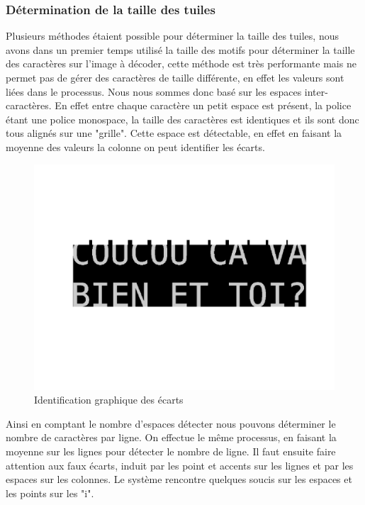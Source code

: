 \documentclass[a4paper,12pt,titlepage]{report}
\begin{document}
	\subsubsection{Détermination de la taille des tuiles}
	Plusieurs méthodes étaient possible pour déterminer la taille des tuiles, nous avons dans un premier temps utilisé la taille des motifs pour déterminer la taille des caractères sur l'image à décoder, cette méthode est très performante mais ne permet pas de gérer des caractères de taille différente, en effet les valeurs sont liées dans le processus. Nous nous sommes donc basé sur les espaces inter-caractères. En effet entre chaque caractère un petit espace est présent, la police étant une police monospace, la taille des caractères est identiques et ils sont donc tous alignés sur une "grille". Cette espace est détectable, en effet en faisant la moyenne des valeurs la colonne on peut identifier les écarts.
	\begin{figure}
		\begin{center}
			\includegraphics[scale=0.4]{../illus/detectionSpace.png}
		\end{center}
		\caption{Identification graphique des écarts}
	\end{figure}


	Ainsi en comptant le nombre d'espaces détecter nous pouvons déterminer le nombre de caractères par ligne.
	On effectue le même processus, en faisant la moyenne sur les lignes pour détecter le nombre de ligne.
	Il faut ensuite faire attention aux faux écarts, induit par les point et accents sur les lignes et par les espaces sur les colonnes.
	Le système rencontre quelques soucis sur les espaces et les points sur les "i".
\end{document}

